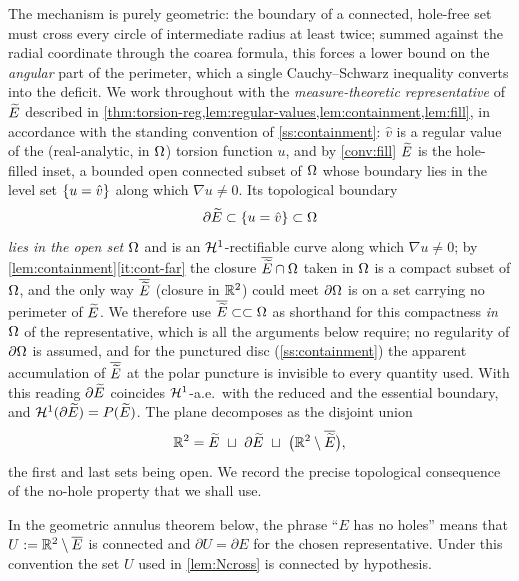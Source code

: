 The mechanism is purely geometric: the boundary of a connected, hole-free
set must cross every circle of intermediate radius at least twice; summed
against the radial coordinate through the coarea formula, this forces a
lower bound on the \emph{angular} part of the perimeter, which a single
Cauchy--Schwarz inequality converts into the deficit. We work throughout
with the \emph{measure-theoretic representative} of $\widetilde{E}$ described in
\cref{thm:torsion-reg,lem:regular-values,lem:containment,lem:fill}, in
accordance with the standing convention of \cref{ss:containment}: $\hat v$ is
a regular value of the (real-analytic, in $\Omega$) torsion function $u$, and by
\cref{conv:fill} $\widetilde{E}$ is the hole-filled inset, a bounded open connected
subset of $\Omega$ whose boundary lies in the level set $\left\{u=\hat v\right\}$ along
which $\nabla u\neq0$. Its topological boundary
\[
   \partial\widetilde{E}\subset\left\{u=\hat v\right\}\subset\Omega
\]
\emph{lies in the open set $\Omega$} and is an $\mathcal{H}^1$-rectifiable curve along
which $\nabla u\neq0$; by \cref{lem:containment}\ref{it:cont-far} the closure
$\overline{\widetilde{E}}\cap\Omega$ taken in $\Omega$ is a compact subset of $\Omega$, and the
only way $\overline{\widetilde{E}}$ (closure in $\mathbb{R}^2$) could meet $\partial\Omega$ is on
a set carrying no perimeter of $\widetilde{E}$. We therefore use $\overline{\widetilde{E}}
\subset\subset\Omega$ as shorthand for this compactness \emph{in $\Omega$} of the
representative, which is all the arguments below require; no regularity of
$\partial\Omega$ is assumed, and for the punctured disc
(\cref{ss:containment}) the apparent accumulation of $\overline{\widetilde{E}}$ at the
polar puncture is invisible to every quantity used. With this reading
$\partial\widetilde{E}$ coincides $\mathcal{H}^1$-a.e.\ with the reduced and the essential
boundary, and $\mathcal{H}^1(\partial\widetilde{E})=P(\widetilde{E})$. The plane decomposes
as the disjoint union
\begin{equation}\label{eq:trichotomy}
   \R^2=\Etil\ \sqcup\ \partial\Etil\ \sqcup\ \bigl(\R^2\setminus\overline\Etil\bigr),
\end{equation}
the first and last sets being open. We record the precise topological
consequence of the no-hole property that we shall use.

\begin{lemma}\label{lem:ext-conn}
In the geometric annulus theorem below, the phrase ``$E$ has no holes'' means
that $U:=\mathbb{R}^2\setminus\overline E$ is connected and
$\partial U=\partial E$ for the chosen representative.  Under this convention
the set $U$ used in \cref{lem:Ncross} is connected by hypothesis.
\end{lemma}

